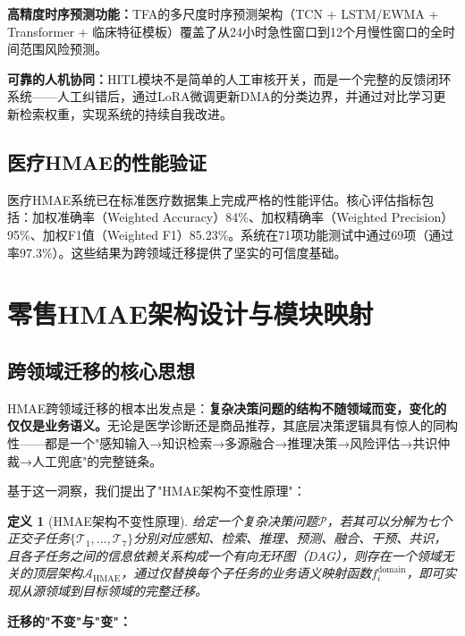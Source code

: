 \documentclass[11pt,a4paper]{ctexart}
\newtheorem{definition}{定义}[section]
\theoremstyle{remark}
\begin{document}
\textbf{高精度时序预测功能：}TFA的多尺度时序预测架构（TCN + LSTM/EWMA + Transformer + 临床特征模板）覆盖了从24小时急性窗口到12个月慢性窗口的全时间范围风险预测。

\textbf{可靠的人机协同：}HITL模块不是简单的人工审核开关，而是一个完整的反馈闭环系统——人工纠错后，通过LoRA微调更新DMA的分类边界，并通过对比学习更新检索权重，实现系统的持续自我改进。

\subsection{医疗HMAE的性能验证}

医疗HMAE系统已在标准医疗数据集上完成严格的性能评估。核心评估指标包括：加权准确率（Weighted Accuracy）84\%、加权精确率（Weighted Precision）95\%、加权F1值（Weighted F1）85.23\%。系统在71项功能测试中通过69项（通过率97.3\%）。这些结果为跨领域迁移提供了坚实的可信度基础。

\newpage

\section{零售HMAE架构设计与模块映射}

\subsection{跨领域迁移的核心思想}

HMAE跨领域迁移的根本出发点是：\textbf{复杂决策问题的结构不随领域而变，变化的仅仅是业务语义。}无论是医学诊断还是商品推荐，其底层决策逻辑具有惊人的同构性——都是一个"感知输入→知识检索→多源融合→推理决策→风险评估→共识仲裁→人工兜底"的完整链条。

基于这一洞察，我们提出了"HMAE架构不变性原理"：

\begin{definition}[HMAE架构不变性原理]
给定一个复杂决策问题$\mathcal{P}$，若其可以分解为七个正交子任务$\{\mathcal{T}_1, \ldots, \mathcal{T}_7\}$分别对应感知、检索、推理、预测、融合、干预、共识，且各子任务之间的信息依赖关系构成一个有向无环图（DAG），则存在一个领域无关的顶层架构$\mathcal{A}_{\text{HMAE}}$，通过仅替换每个子任务的业务语义映射函数$f_i^{\text{domain}}$，即可实现从源领域到目标领域的完整迁移。
\end{definition}

\textbf{迁移的"不变"与"变"：}
\end{document}
